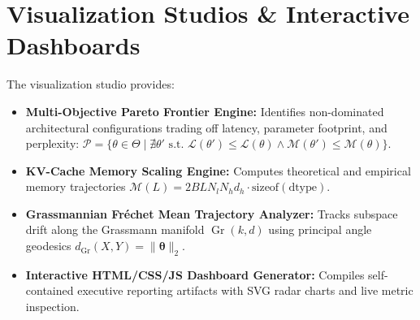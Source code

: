 \section{Visualization Studios \& Interactive Dashboards}
\label{app:vis_details}

The visualization studio provides:
\begin{itemize}
    \item \textbf{Multi-Objective Pareto Frontier Engine:} Identifies non-dominated architectural configurations trading off latency, parameter footprint, and perplexity: $\mathcal{P} = \{ \theta \in \Theta \mid \nexists \theta' \text{ s.t. } \mathcal{L}(\theta') \le \mathcal{L}(\theta) \land \mathcal{M}(\theta') \le \mathcal{M}(\theta) \}$.
    \item \textbf{KV-Cache Memory Scaling Engine:} Computes theoretical and empirical memory trajectories $\mathcal{M}(L) = 2 B L N_l N_h d_h \cdot \text{sizeof}(\text{dtype})$.
    \item \textbf{Grassmannian Fr\'echet Mean Trajectory Analyzer:} Tracks subspace drift along the Grassmann manifold $\operatorname{Gr}(k, d)$ using principal angle geodesics $d_{\operatorname{Gr}}(X, Y) = \|\bm{\theta}\|_2$.
    \item \textbf{Interactive HTML/CSS/JS Dashboard Generator:} Compiles self-contained executive reporting artifacts with SVG radar charts and live metric inspection.
\end{itemize}
